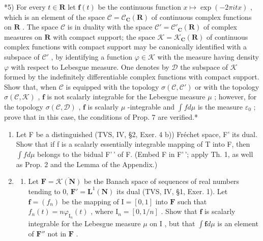 *5) For every \(t \in \mathbf{R}\) let \(\mathbf{f}(t)\) be the continuous function \(x \mapsto \exp(-2\pi itx)\) , which is an element of the space \(\mathcal{C} = \mathcal{C}_{\mathbf{C}}(\mathbf{R})\) of continuous complex functions on \(\mathbf{R}\) . The space \(\mathcal{C}\) is in duality with the space \(\mathcal{C}' = \mathcal{C}'_{\mathbf{C}}(\mathbf{R})\) of complex measures on \(\mathbf{R}\) with compact support; the space \(\mathcal{K} = \mathcal{K}_{\mathbf{C}}(\mathbf{R})\) of continuous complex functions with compact support may be canonically identified with a subspace of \(\mathcal{C}'\) , by identifying a function \(\varphi \in \mathcal{K}\) with the measure having density \(\varphi\) with respect to Lebesgue measure. One denotes by \(\mathcal{D}\) the subspace of \(\mathcal{K}\) formed by the indefinitely differentiable complex functions with compact support. Show that, when \(\mathcal{C}\) is equipped with the topology \(\sigma(\mathcal{C},\mathcal{C}')\) or with the topology \(\sigma(\mathcal{C},\mathcal{K})\) , \(\mathbf{f}\) is not scalarly integrable for the Lebesgue measure \(\mu\) ; however, for the topology \(\sigma(\mathcal{C},\mathcal{D})\) , \(\mathbf{f}\) is scalarly \(\mu\) -integrable and \(\int f d\mu\) is the measure \(\varepsilon_0\) ; prove that in this case, the conditions of Prop. 7 are verified.*

\begin{enumerate}
\def\labelenumi{\arabic{enumi})}
\setcounter{enumi}{5}
\item
  Let F be a distinguished (TVS, IV, §2, Exer. 4 b)) Fréchet space, F' its dual. Show that if f is a scalarly essentially integrable mapping of T into F, then \(\int f d\mu\) belongs to the bidual F'\,' of F. (Embed F in F'\,'; apply Th. 1, as well as Prop. 2 and the Lemma of the Appendix.)
\item
  \begin{enumerate}
  \def\labelenumii{\alph{enumii})}
  \tightlist
  \item
    Let \(\mathbf{F} = \overline{\mathcal{K}(\mathbf{N})}\) be the Banach space of sequences of real numbers tending to 0, \(\mathbf{F}' = \mathbf{L}^1 (\mathbf{N})\) its dual (TVS, IV, §1, Exer. 1). Let \(\mathbf{f} = (f_n)\) be the mapping of \(\mathrm{I} = [0,1]\) into \(\mathbf{F}\) such that \(f_{n}(t) = n\varphi_{\mathrm{I}_{n}}(t)\) , where \(\mathrm{I}_n = [0,1 / n]\) . Show that \(\mathbf{f}\) is scalarly integrable for the Lebesgue measure \(\mu\) on \(\mathrm{I}\) , but that \(\int \mathbf{f}d\mu\) is an element of \(\mathbf{F}''\) not in \(\mathbf{F}\) .
  \end{enumerate}
\end{enumerate}

